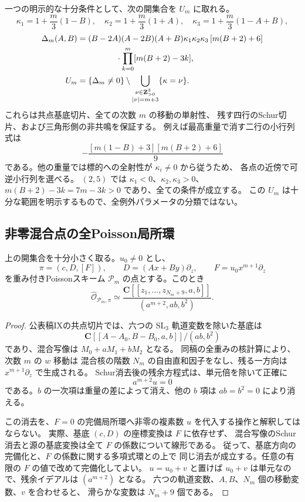 一つの明示的な十分条件として、次の開集合を $U_m$ に取れる。
\[
 \kappa_1=1+\frac m3(1-B),\quad
 \kappa_2=1+\frac m3(1+A),\quad
 \kappa_3=1+\frac m3(1-A+B),
\]
\begin{align*}
 \Delta_m(A,B)={}&(B-2A)(A-2B)(A+B)
                  \kappa_1\kappa_2\kappa_3\,[m(B+2)+6]\\
 &\hspace{12mm}\cdot\prod_{k=0}^{m}[m(B+2)-3k],\\
 U_m={}&\{\Delta_m\ne0\}\setminus
       \bigcup_{\substack{\nu\in\mathbf Z_{>0}^3\\|\nu|=m+3}}
       \{\kappa=\nu\}.
\end{align*}
これらは共点基底切片、全ての次数 $m$ の移動の単射性、
残す四行のSchur切片、および三角形側の非共鳴を保証する。
例えば最高重量で消す二行の小行列式は
\[
 -\frac{[m(1-B)+3][m(B+2)+6]}9
\]
である。他の重量では標的への全射性が $\kappa_i\ne0$ から従うため、
各点の近傍で可逆小行列を選べる。
$(2,5)$ では $\kappa_1<0$、$\kappa_2,\kappa_3>0$、
$m(B+2)-3k=7m-3k>0$ であり、全ての条件が成立する。
この $U_m$ は十分な範囲を明示するもので、全例外パラメータの分類ではない。

\subsection{非零混合点の全Poisson局所環}

\begin{lemma}[残余混合係数を反転した局所環]
\label{lem:pullback-nonzero-local-v37}
上の開集合を十分小さく取る。$u_0\ne0$ とし、
\[
 \pi=(c,D,[F]),\qquad
 D=(Ax+By)\partial_z,\qquad F=u_0x^{m+1}\partial_z
\]
を重み付きPoissonスキーム $\mathscr P_m$ の点とする。このとき
\[
 \widehat{\mathcal O}_{\mathscr P_m,\pi}
 \simeq
 \frac{\mathbf C[[z_1,\ldots,z_{N_m+9},a,b]]}
 {(a^{m+2},ab,b^2)}.
\]
\end{lemma}

\begin{proof}
公表稿IXの共点切片では、六つの $\mathrm{SL}_3$ 軌道変数を除いた基底は
\[
 \mathbf C[[A-A_0,B-B_0,a,b]]/(ab,b^2)
\]
であり、混合写像は $M_0+aM_1+bM_2$ となる。
同稿の全重みの核計算により、次数 $m$ の $w$ 移動は
混合核の階数 $N_m$ の自由直和因子をなし、残る一方向は
$x^{m+1}\partial_z$ で生成される。
Schur消去後の残余方程式は、単元倍を除いて正確に
\[
 a^{m+2}u=0
\]
である。$b$ の一次項は重量の差によって消え、他の $b$ 項は $ab=b^2=0$ により消える。

この消去を、$F=0$ の完備局所環へ非零の複素数 $u$ を代入する操作と解釈してはならない。
実際、基底 $(c,D)$ の座標変換は $F$ に依存せず、
混合写像のSchur消去と源の基底変換は全て $F$ の係数について線形である。
従って、基底方向の完備化と、$F$ の係数に関する多項式環との上で
同じ消去が成立する。任意の有限の $F$ の値で改めて完備化してよい。
$u=u_0+v$ と置けば $u_0+v$ は単元なので、残余イデアルは $(a^{m+2})$ となる。
六つの軌道変数、$A,B$、$N_m$ 個の移動変数、$v$ を合わせると、
滑らかな変数は $N_m+9$ 個である。
\end{proof}

